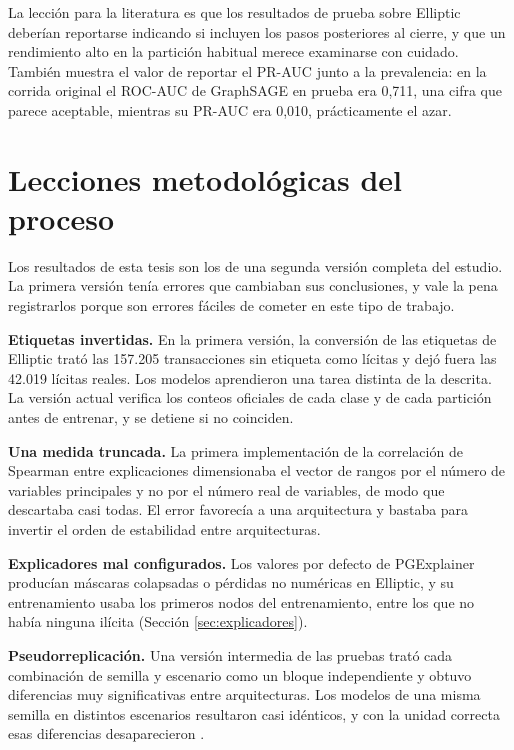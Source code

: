 La lección para la literatura es que los resultados de prueba sobre Elliptic deberían
reportarse indicando si incluyen los pasos posteriores al cierre, y que un rendimiento alto en
la partición habitual merece examinarse con cuidado. También muestra el valor de reportar el
PR-AUC junto a la prevalencia: en la corrida original el ROC-AUC de GraphSAGE en prueba era
0,711, una cifra que parece aceptable, mientras su PR-AUC era 0,010, prácticamente el azar.

\section{Lecciones metodológicas del proceso}\label{sec:dis_lecciones}

Los resultados de esta tesis son los de una segunda versión completa del estudio. La primera
versión tenía errores que cambiaban sus conclusiones, y vale la pena registrarlos porque son
errores fáciles de cometer en este tipo de trabajo.

\textbf{Etiquetas invertidas.} En la primera versión, la conversión de las etiquetas de Elliptic
trató las 157.205 transacciones sin etiqueta como lícitas y dejó fuera las 42.019 lícitas reales.
Los modelos aprendieron una tarea distinta de la descrita. La versión actual verifica los conteos
oficiales de cada clase y de cada partición antes de entrenar, y se detiene si no coinciden.

\textbf{Una medida truncada.} La primera implementación de la correlación de Spearman entre
explicaciones dimensionaba el vector de rangos por el número de variables principales y no por
el número real de variables, de modo que descartaba casi todas. El error favorecía a una
arquitectura y bastaba para invertir el orden de estabilidad entre arquitecturas.

\textbf{Explicadores mal configurados.} Los valores por defecto de PGExplainer producían máscaras
colapsadas o pérdidas no numéricas en Elliptic, y su entrenamiento usaba los primeros nodos del
entrenamiento, entre los que no había ninguna ilícita (Sección \ref{sec:explicadores}).

\textbf{Pseudorreplicación.} Una versión intermedia de las pruebas trató cada combinación de
semilla y escenario como un bloque independiente y obtuvo diferencias muy significativas entre
arquitecturas. Los modelos de una misma semilla en distintos escenarios resultaron casi
idénticos, y con la unidad correcta esas diferencias desaparecieron
\cite{Hurlbert1984, Lazic2010}.

